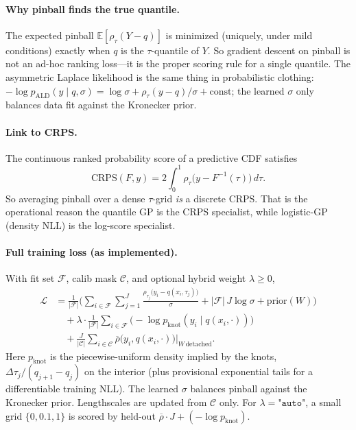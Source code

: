 \documentclass[11pt,a4paper]{article}
\theoremstyle{definition}
\newcommand{\E}{\mathbb{E}}
\begin{document}
\paragraph{Why pinball finds the true quantile.}
The expected pinball $\E[\rho_\tau(Y-q)]$ is minimized (uniquely, under mild
conditions) exactly when $q$ is the $\tau$-quantile of $Y$. So gradient
descent on pinball is not an ad-hoc ranking loss---it is the proper scoring
rule for a single quantile. The asymmetric Laplace likelihood is the same
thing in probabilistic clothing:
$-\log p_{\mathrm{ALD}}(y\mid q,\sigma)=\log\sigma+\rho_\tau(y-q)/\sigma+\mathrm{const}$;
the learned $\sigma$ only balances data fit against the Kronecker prior.

\paragraph{Link to CRPS.}
The continuous ranked probability score of a predictive CDF satisfies
\begin{equation}
  \mathrm{CRPS}(F,y)
  =
  2\int_0^1 \rho_\tau\bigl(y-F^{-1}(\tau)\bigr)\,d\tau.
\end{equation}
So averaging pinball over a dense $\tau$-grid \emph{is} a discrete CRPS.
That is the operational reason the quantile GP is the CRPS specialist, while
logistic-GP (density NLL) is the log-score specialist.

\paragraph{Full training loss (as implemented).}
With fit set $\mathcal{F}$, calib mask $\mathcal{C}$, and optional hybrid
weight $\lambda\ge 0$,
\begin{align}
  \mathcal{L}
  &=
  \frac{1}{|\mathcal{F}|}
  \Biggl(
    \sum_{i\in\mathcal{F}}\sum_{j=1}^{J}
      \frac{\rho_{\tau_j}\bigl(y_i-q(x_i,\tau_j)\bigr)}{\sigma}
    +
    |\mathcal{F}|\,J\log\sigma
    +
    \mathrm{prior}(W)
  \Biggr)
  \nonumber\\
  &\quad
  +
  \lambda\cdot
  \frac{1}{|\mathcal{F}|}
  \sum_{i\in\mathcal{F}}
  \bigl(-\log p_{\mathrm{knot}}(y_i\mid q(x_i,\cdot))\bigr)
  \nonumber\\
  &\quad
  +
  \frac{J}{|\mathcal{C}|}
  \sum_{i\in\mathcal{C}}
  \overline{\rho}\bigl(y_i,q(x_i,\cdot)\bigr)\Big|_{W\,\mathrm{detached}}.
\end{align}
Here $p_{\mathrm{knot}}$ is the piecewise-uniform density implied by the knots,
$\Delta\tau_j/(q_{j+1}-q_j)$ on the interior (plus provisional exponential
tails for a differentiable training NLL). The learned $\sigma$ balances
pinball against the Kronecker prior. Lengthscales are updated from $\mathcal{C}$
only. For $\lambda=\texttt{"auto"}$, a small grid $\{0,0.1,1\}$ is scored by
held-out $\overline{\rho}\cdot J+(-\log p_{\mathrm{knot}})$.
\end{document}
